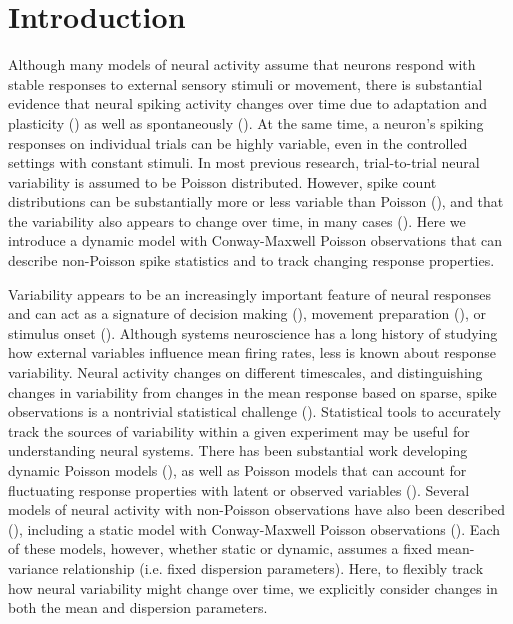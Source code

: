 \documentclass[aoas]{imsart}
\theoremstyle{plain}
\theoremstyle{remark}
\begin{document}
\section{Introduction}
Although many models of neural activity assume that neurons respond with stable responses to external sensory stimuli or movement, there is substantial evidence that neural spiking activity changes over time due to adaptation and plasticity (\cite{Brown2001,Lesica2007}) as well as spontaneously (\cite{Rokni2007,Tomko1974}). At the same time, a neuron’s spiking responses on individual trials can be highly variable, even in the controlled settings with constant stimuli. In most previous research, trial-to-trial neural variability is assumed to be Poisson distributed. However, spike count distributions can be substantially more or less variable than Poisson (\cite{Maimon2009,Amarasingham2006,DeWeese2003,Kara2000}), and that the variability also appears to change over time, in many cases (\cite{Churchland2010,Churchland2011}). Here we introduce a dynamic model with Conway-Maxwell Poisson observations that can describe non-Poisson spike statistics and to track changing response properties.

Variability appears to be an increasingly important feature of neural responses and can act as a signature of decision making (\cite{Churchland2011}), movement preparation (\cite{Churchland2006}), or stimulus onset (\cite{Churchland2010}). Although systems neuroscience has a long history of studying how external variables influence mean firing rates, less is known about response variability. Neural activity changes on different timescales, and distinguishing changes in variability from changes in the mean response based on sparse, spike observations is a nontrivial statistical challenge (\cite{DeWeese1998}). Statistical tools to accurately track the sources of variability within a given experiment may be useful for understanding neural systems. There has been substantial work developing dynamic Poisson models (\cite{Brown2001,Eden2004}), as well as Poisson models that can account for fluctuating response properties with latent or observed variables (\cite{Czanner2008,Smith2003}). Several models of neural activity with non-Poisson observations have also been described (\cite{DeWeese2003,Gao2015,Pillow2012}), including a static model with Conway-Maxwell Poisson observations (\cite{Stevenson2016}). Each of these models, however, whether static or dynamic, assumes a fixed mean-variance relationship (i.e. fixed dispersion parameters). Here, to flexibly track how neural variability might change over time, we explicitly consider changes in both the mean and dispersion parameters.
\end{document}
